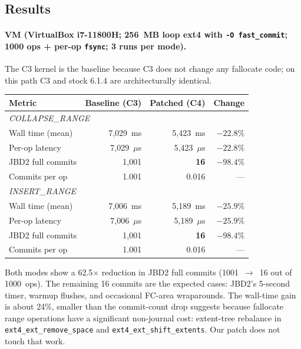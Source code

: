 \documentclass[12pt,a4paper]{article}
\begin{document}
\subsection{Results}

\paragraph{VM (VirtualBox i7-11800H; 256~MB loop ext4 with
\texttt{-O fast\_commit}; 1000 ops + per-op \texttt{fsync};
3 runs per mode).}  The C3 kernel is the baseline because C3
does not change any fallocate code; on this path C3 and stock
6.1.4 are architecturally identical.

\begin{center}
\begin{tabular}{lrrr}
\toprule
Metric & Baseline (C3) & Patched (C4) & Change \\
\midrule
\multicolumn{4}{l}{\textit{COLLAPSE\_RANGE}} \\
Wall time (mean)     & 7{,}029~ms       & 5{,}423~ms       & $-22.8\%$ \\
Per-op latency       & 7{,}029~$\mu$s   & 5{,}423~$\mu$s   & $-22.8\%$ \\
JBD2 full commits    & 1{,}001 & \textbf{16} & $\mathbf{-98.4\%}$ \\
Commits per op       & 1.001   & 0.016       & --- \\
\midrule
\multicolumn{4}{l}{\textit{INSERT\_RANGE}} \\
Wall time (mean)     & 7{,}006~ms       & 5{,}189~ms       & $-25.9\%$ \\
Per-op latency       & 7{,}006~$\mu$s   & 5{,}189~$\mu$s   & $-25.9\%$ \\
JBD2 full commits    & 1{,}001 & \textbf{16} & $\mathbf{-98.4\%}$ \\
Commits per op       & 1.001   & 0.016       & --- \\
\bottomrule
\end{tabular}
\end{center}

Both modes show a 62.5$\times$ reduction in JBD2 full commits
(1001~$\to$~16 out of 1000~ops).  The remaining 16 commits are
the expected cases: JBD2's 5-second timer, warmup flushes, and
occasional FC-area wraparounds.  The wall-time gain is about 24\%,
smaller than the commit-count drop suggests because fallocate range
operations have a significant non-journal cost: extent-tree
rebalance in \texttt{ext4\_ext\_remove\_space} and
\texttt{ext4\_ext\_shift\_extents}.  Our patch does not touch that
work.
\end{document}
